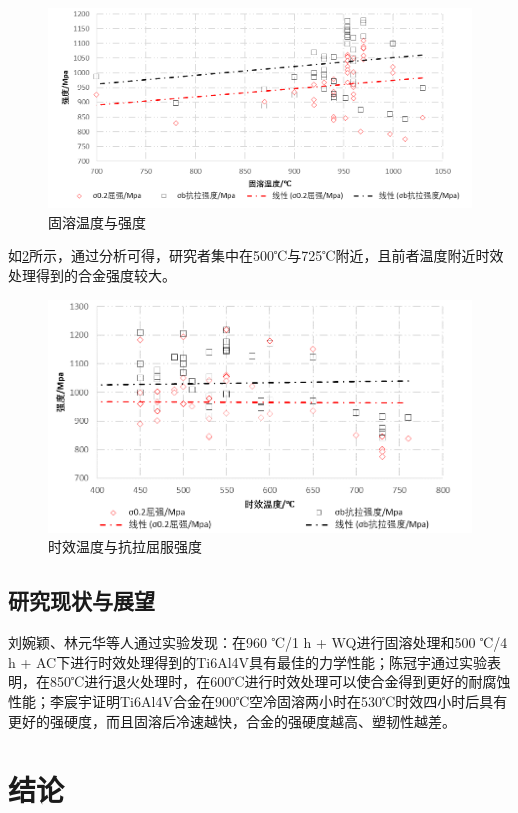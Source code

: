 \documentclass[
class = book,
zihao = -4,
font = noto,
paper = a4paper,
openany
]{easybook}
\newcommand{\ti}{Ti6Al4V}
\begin{document}
\begin{figure}[h!]
	\centering
	\includegraphics[width=0.7\linewidth]{固溶温度与强度}
	\caption{固溶温度与强度}
	\label{fig:固溶温度与强度}
\end{figure}

如\ref{fig:时效温度与抗拉屈服强度}所示，通过分析可得，研究者集中在500℃与725℃附近，且前者温度附近时效处理得到的合金强度较大。
\begin{figure}[h!]
	\centering
	\includegraphics[width=0.7\linewidth]{时效温度与强度}
	\caption{时效温度与抗拉屈服强度}
	\label{fig:时效温度与抗拉屈服强度}
\end{figure}

\section{研究现状与展望}
 刘婉颖、林元华等人通过实验发现：在960 ℃/1 h + WQ进行固溶处理和500 ℃/4 h + AC下进行时效处理得到的\ti 具有最佳的力学性能\cite{LiuWanYingBuTongReChuLiGongYiDuiTi6Al4VTaiHeJinWeiGuanJieGouHeLiXueXingNengYingXiangYingWen2017}；陈冠宇通过实验表明，在850℃进行退火处理时，在600℃进行时效处理可以使合金得到更好的耐腐蚀性能\cite{1200}；李宸宇证明\ti 合金在900℃空冷固溶两小时在530℃时效四小时后具有更好的强硬度，而且固溶后冷速越快，合金的强硬度越高、塑韧性越差\cite{900}。%
\chapter{结论}




	\backmatter
	\listoffigures
	\listoftables
	\clearpage
	
\end{document}
